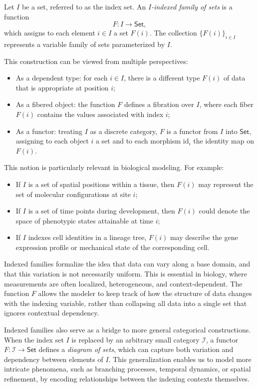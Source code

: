 \begin{definition}
Let $I$ be a set, referred to as the index set. An \emph{$I$-indexed family of sets} is a function
\[
F : I \to \textsf{Set},
\]
which assigns to each element $i \in I$ a set $F(i)$. The collection $\{F(i)\}_{i \in I}$ represents a variable family of sets parameterized by $I$.
\end{definition}

This construction can be viewed from multiple perspectives:
\begin{itemize}
  \item As a dependent type: for each $i \in I$, there is a different type $F(i)$ of data that is appropriate at position $i$;
  \item As a fibered object: the function $F$ defines a fibration over $I$, where each fiber $F(i)$ contains the values associated with index $i$;
  \item As a functor: treating $I$ as a discrete category, $F$ is a functor from $I$ into $\textsf{Set}$, assigning to each object $i$ a set and to each morphism $\mathrm{id}_i$ the identity map on $F(i)$. 
\end{itemize}

\pagebreak

This notion is particularly relevant in biological modeling. For example:
\begin{itemize}
  \item If $I$ is a set of spatial positions within a tissue, then $F(i)$ may represent the set of molecular configurations at site $i$;
  \item If $I$ is a set of time points during development, then $F(i)$ could denote the space of phenotypic states attainable at time $i$;
  \item If $I$ indexes cell identities in a lineage tree, $F(i)$ may describe the gene expression profile or mechanical state of the corresponding cell.
\end{itemize}

Indexed families formalize the idea that data can vary along a base domain, and that this variation is not necessarily uniform. This is essential in biology, where measurements are often localized, heterogeneous, and context-dependent. The function $F$ allows the modeler to keep track of how the structure of data changes with the indexing variable, rather than collapsing all data into a single set that ignores contextual dependency.

Indexed families also serve as a bridge to more general categorical constructions. When the index set $I$ is replaced by an arbitrary small category $\mathcal{I}$, a functor $F : \mathcal{I} \to \textsf{Set}$ defines a \emph{diagram of sets}, which can capture both variation and dependency between elements of $I$. This generalization enables us to model more intricate phenomena, such as branching processes, temporal dynamics, or spatial refinement, by encoding relationships between the indexing contexts themselves.

